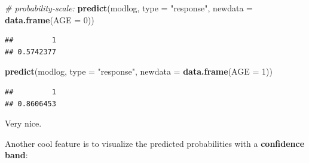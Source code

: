 \documentclass[
]{book}
\newenvironment{Shaded}{\begin{snugshade}}{\end{snugshade}}
\newcommand{\AttributeTok}[1]{\textcolor[rgb]{0.13,0.29,0.53}{#1}}
\newcommand{\CommentTok}[1]{\textcolor[rgb]{0.56,0.35,0.01}{\textit{#1}}}
\newcommand{\DecValTok}[1]{\textcolor[rgb]{0.00,0.00,0.81}{#1}}
\newcommand{\FunctionTok}[1]{\textcolor[rgb]{0.13,0.29,0.53}{\textbf{#1}}}
\newcommand{\NormalTok}[1]{#1}
\newcommand{\StringTok}[1]{\textcolor[rgb]{0.31,0.60,0.02}{#1}}
\begin{document}
\begin{Shaded}
\begin{Highlighting}[]
\CommentTok{\# probability{-}scale:}
\FunctionTok{predict}\NormalTok{(modlog, }\AttributeTok{type =} \StringTok{"response"}\NormalTok{,}
        \AttributeTok{newdata =} \FunctionTok{data.frame}\NormalTok{(}\AttributeTok{AGE =} \DecValTok{0}\NormalTok{))}
\end{Highlighting}
\end{Shaded}

\begin{verbatim}
##         1 
## 0.5742377
\end{verbatim}

\begin{Shaded}
\begin{Highlighting}[]
\FunctionTok{predict}\NormalTok{(modlog, }\AttributeTok{type =} \StringTok{"response"}\NormalTok{,}
        \AttributeTok{newdata =} \FunctionTok{data.frame}\NormalTok{(}\AttributeTok{AGE =} \DecValTok{1}\NormalTok{))}
\end{Highlighting}
\end{Shaded}

\begin{verbatim}
##         1 
## 0.8606453
\end{verbatim}

Very nice.

Another cool feature is to visualize the predicted probabilities
with a \textbf{confidence band}:
\end{document}
